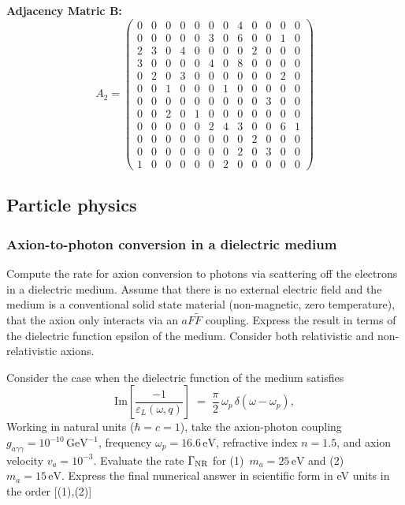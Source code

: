 \textbf{Adjacency Matric B:}
\[
A_2 = \begin{pmatrix}
0 & 0 & 0 & 0 & 0 & 0 & 0 & 4 & 0 & 0 & 0 & 0 \\
0 & 0 & 0 & 0 & 0 & 3 & 0 & 6 & 0 & 0 & 1 & 0 \\
2 & 3 & 0 & 4 & 0 & 0 & 0 & 0 & 2 & 0 & 0 & 0 \\
3 & 0 & 0 & 0 & 0 & 4 & 0 & 8 & 0 & 0 & 0 & 0 \\
0 & 2 & 0 & 3 & 0 & 0 & 0 & 0 & 0 & 0 & 2 & 0 \\
0 & 0 & 1 & 0 & 0 & 0 & 1 & 0 & 0 & 0 & 0 & 0 \\
0 & 0 & 0 & 0 & 0 & 0 & 0 & 0 & 0 & 3 & 0 & 0 \\
0 & 0 & 2 & 0 & 1 & 0 & 0 & 0 & 0 & 0 & 0 & 0 \\
0 & 0 & 0 & 0 & 0 & 2 & 4 & 3 & 0 & 0 & 6 & 1 \\
0 & 0 & 0 & 0 & 0 & 0 & 0 & 0 & 2 & 0 & 0 & 0 \\
0 & 0 & 0 & 0 & 0 & 0 & 0 & 2 & 0 & 3 & 0 & 0 \\
1 & 0 & 0 & 0 & 0 & 0 & 2 & 0 & 0 & 0 & 0 & 0
\end{pmatrix}
\]

\subsection{Particle physics}
\label{problems:particle-physics}

\subsubsection{Axion-to-photon conversion in a dielectric medium}
\label{problem:axion-dielectric-conversion}
Compute the rate for axion conversion to photons via scattering off the electrons in a dielectric medium. Assume that there is no external electric field and the medium is a  conventional solid state material (non-magnetic, zero temperature), that the axion only interacts via an  $a F \tilde{F}$ coupling. Express the result in terms of the dielectric function epsilon of the medium. Consider both relativistic and non-relativistic axions.

Consider the case when the dielectric function of the medium satisfies
\begin{equation}
    \mathrm{Im}\!\left[\frac{-1}{\varepsilon_L(\omega, q)}\right]
    \;=\; \frac{\pi}{2}\,\omega_p\,\delta(\omega-\omega_p),
\end{equation}
Working in natural units ($\hbar = c=1$), take the axion-photon coupling $g_{a\gamma\gamma}=10^{-10}\,\mathrm{GeV}^{-1}$, frequency $\omega_p = 16.6\,\mathrm{eV}$,
refractive index $n = 1.5$, and axion velocity $v_a = 10^{-3}$.
Evaluate the rate $\Gamma_{\rm NR}$ for
(1)~$m_a = 25\,\mathrm{eV}$ and (2)~$m_a = 15\,\mathrm{eV}$. Express the final numerical answer in scientific form in eV units in the order [(1),(2)]

